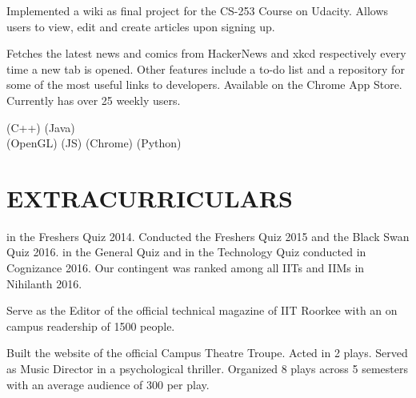 \documentclass[]{deedy-resume-openfont}
\begin{document}
\begin{minipage}[t]{0.66\textwidth}
Implemented a wiki as final project for the CS-253 Course on Udacity. Allows users to view, edit and create articles upon signing up.
\sectionsep

Fetches the latest news and comics from HackerNews and xkcd respectively every time a new tab is opened. Other features include a to-do list and a repository for some of the most useful links to developers. Available on the Chrome App Store. Currently has over 25 weekly users.
\sectionsep

(C++) \textbullet{}  (Java) \\  (OpenGL) \textbullet{}  (JS) \textbullet{}  (Chrome)  (Python)
\sectionsep


\section{EXTRACURRICULARS} 
 in the Freshers Quiz 2014. Conducted the Freshers Quiz 2015 and the Black Swan Quiz 2016.  in the General Quiz and  in the Technology Quiz conducted in Cognizance 2016. Our contingent was ranked  among all IITs and IIMs in Nihilanth 2016.
\sectionsep

Serve as the Editor of the official technical magazine of IIT Roorkee with an on campus readership of 1500 people.
\sectionsep

Built the website of the official Campus Theatre Troupe. Acted in 2 plays. Served as Music Director in a psychological thriller. Organized 8 plays across 5 semesters with an average audience of 300 per play.
\end{minipage} 
\end{document}
